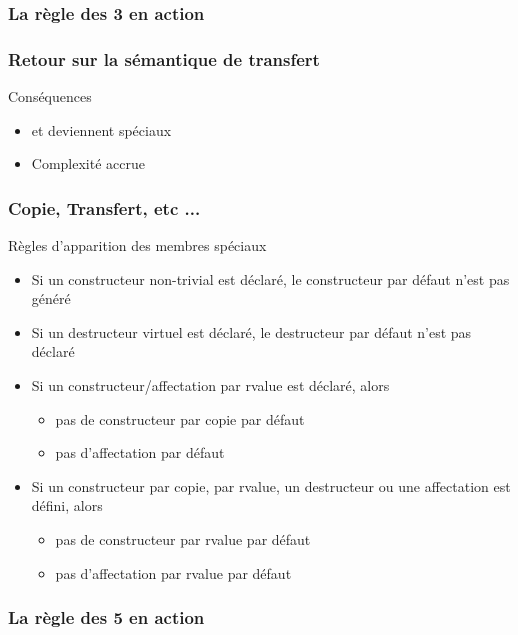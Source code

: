 \documentclass[svgnames]{beamer}
\begin{document}
\frame
{
  \frametitle{La règle des 3 en action}
}

\frame
{
  \frametitle{Retour sur la sémantique de transfert}
  \begin{center}\end{center}
  \begin{block}{Conséquences}
  \begin{itemize}
  \item {} et  deviennent spéciaux
  \item Complexité accrue
  \end{itemize}  
  \end{block}{}
}

\frame
{
  \frametitle{Copie, Transfert, etc ...}
  \begin{block}{Règles d'apparition des membres spéciaux}
  \begin{itemize}
  \item  Si un constructeur non-trivial est déclaré, le constructeur par défaut n'est pas généré
   \item Si un destructeur virtuel est déclaré, le destructeur par défaut n'est pas déclaré
   \item Si un constructeur/affectation par rvalue est déclaré, alors
  \begin{itemize}
      \item pas de constructeur par copie par défaut
      \item pas d'affectation par défaut
  \end{itemize}
   \item  Si un constructeur par copie, par rvalue, un destructeur ou une
     affectation est défini, alors
  \begin{itemize}
    \item pas de constructeur par rvalue par défaut
    \item pas d'affectation par rvalue par défaut
  \end{itemize}
  \end{itemize}
  \end{block}
}

\frame
{
  \frametitle{La règle des 5 en action}
}
\end{document}
